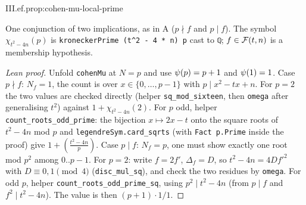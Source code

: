 \begin{proposition}
\end{proposition}
\begin{tfformal}{III.ef.prop:cohen-mu-local-prime}
\begin{tffidelity}
One conjunction of two implications, as in A ($p\nmid f$ and $p\mid f$). The symbol $\chi_{t^2-4n}(p)$ is \texttt{kroneckerPrime (t\^{}2 - 4 * n) p} cast to \texttt{ℚ}; $f\in\mathcal{F}(t,n)$ is a membership hypothesis.
\end{tffidelity}
\end{tfformal}
\begin{proof}[Lean proof]
Unfold \texttt{cohenMu} at $N=p$ and use $\psi(p)=p+1$ and $\psi(1)=1$. Case $p\nmid f$: $N_f=1$, the count is over $x\in\{0,\dots,p-1\}$ with $p\mid x^2-tx+n$. For $p=2$ the two values are checked directly (helper \texttt{sq\_mod\_sixteen}, then \texttt{omega} after generalising $t^2$) against $1+\chi_{t^2-4n}(2)$. For $p$ odd, helper \texttt{count\_roots\_odd\_prime}: the bijection $x\mapsto2x-t$ onto the square roots of $t^2-4n$ mod $p$ and \texttt{legendreSym.card\_sqrts} (with \texttt{Fact p.Prime} inside the proof) give $1+\left(\frac{t^2-4n}{p}\right)$. Case $p\mid f$: $N_f=p$, one must show exactly one root mod $p^2$ among $0..p-1$. For $p=2$: write $f=2f'$, $\Delta_f=D$, so $t^2-4n=4Df'^2$ with $D\equiv0,1\pmod4$ (\texttt{disc\_mul\_sq}), and check the two residues by \texttt{omega}. For odd $p$, helper \texttt{count\_roots\_odd\_prime\_sq}, using $p^2\mid t^2-4n$ (from $p\mid f$ and $f^2\mid t^2-4n$). The value is then $(p+1)\cdot1/1$.
\end{proof}

